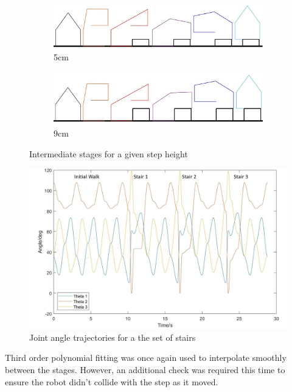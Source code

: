 \documentclass[twoside,twocolumn]{article}
\begin{document}
\begin{figure}[h]
  \centering
  \begin{subfigure}[t]{0.5\textwidth}
    \includegraphics[width=\linewidth]{stepstages}
  \caption{5cm}
  \label{fig:stair5}
  \end{subfigure}
  \begin{subfigure}[t]{0.5\textwidth}
    \includegraphics[width=\linewidth]{stepstages9}
  \caption{9cm}
  \label{fig:stair9}
  \end{subfigure}
  \caption{Intermediate stages for a given step height}
  \label{fig:stair}
\end{figure}
\begin{figure}[h]
  \centering
    \includegraphics[width=0.96\linewidth]{steptraj}
  \caption{Joint angle trajectories for a the set of stairs}
  \label{fig:stj}
\end{figure}
Third order polynomial fitting was once again used to interpolate smoothly between the stages. However, an additional check was required this time to ensure the robot didn't collide with the step as it moved.
\newline
\end{document}

